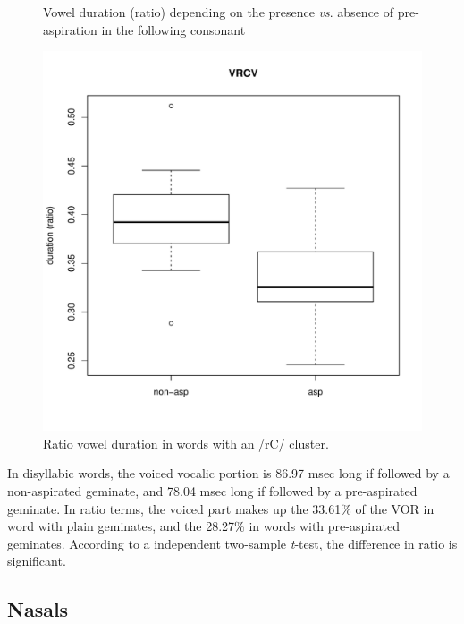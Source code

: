 \documentclass[11pt,a4paper,openany]{memoir}\usepackage[]{graphicx}\usepackage[]{color}
\newenvironment{knitrout}{}{} %
\begin{document}
\begin{figure}
\begin{subfigure}{.5\textwidth}
\begin{knitrout}
\end{knitrout}
\end{subfigure}
\caption{Vowel duration (ratio) depending on the presence \textit{vs}. absence of pre-aspiration in the following consonant}
\label{f:vowelduration}
\end{figure}

\begin{figure}
\centering
\begin{knitrout}
\color{fgcolor}
\includegraphics[width=\textwidth]{img/di-rho-box-1} 

\end{knitrout}
\caption{Ratio vowel duration in words with an /rC/ cluster.}
\label{f:voweldurrho}
\end{figure}



In disyllabic words, the voiced vocalic portion is 86.97 msec long if followed by a non-aspirated geminate, and 78.04 msec long if followed by a pre-aspirated geminate.
In ratio terms, the voiced part makes up the 33.61\% of the VOR in word with plain geminates, and the 28.27\% in words with pre-aspirated geminates.
According to a independent two-sample \textit{t}-test, the difference in ratio is significant.

\subsection{Nasals}
\end{document}
